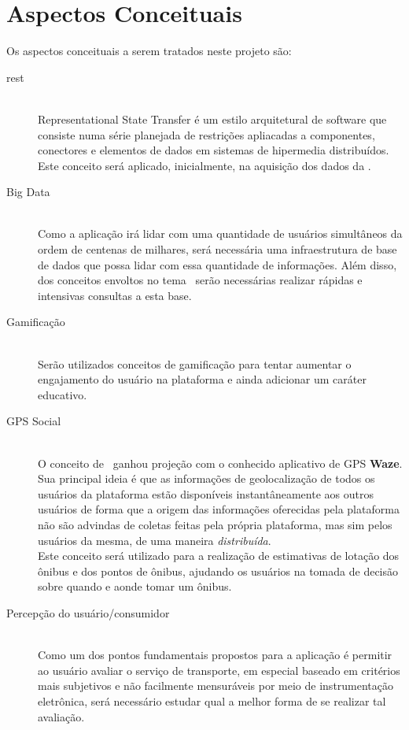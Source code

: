 \chapter{Aspectos Conceituais}\label{chp:aspectosConceituais}

Os aspectos conceituais a serem tratados neste projeto são:
\begin{description}
	\item[\gls{rest}] \cite{Fielding2000} \hfill \\
	    Representational State Transfer é um estilo arquitetural de software que consiste numa série planejada de restrições apliacadas a componentes, conectores e elementos de dados em sistemas de hipermedia distribuídos. \\
	    Este conceito será aplicado, inicialmente, na aquisição dos dados da \sptrans.
	\item[Big Data] \hfill \\
	    Como a aplicação irá lidar com uma quantidade de usuários simultâneos da ordem de centenas de milhares, será necessária uma infraestrutura de base de dados que possa lidar com essa quantidade de informações. Além disso, dos conceitos envoltos no tema \bigdata~serão necessárias realizar rápidas e intensivas consultas a esta base.
	\item[Gamificação] \cite{vieira2012exploratory,Mastrocola2012} \hfill \\
	    Serão utilizados conceitos de gamificação para tentar aumentar o engajamento do usuário na plataforma e ainda adicionar um caráter educativo.
	\item[GPS Social]\cite{Miller2013,Gal-Tzur2014a,Filippi2013,Gal-Tzur2014,Nunes2014} \hfill \\
	    O conceito de \gpssocial~ganhou projeção com o conhecido aplicativo de GPS \textbf{Waze}. Sua principal ideia é que as informações de geolocalização de todos os usuários da plataforma estão disponíveis instantâneamente aos outros usuários de forma que a origem das informações oferecidas pela plataforma não são advindas de coletas feitas pela própria plataforma, mas sim pelos usuários da mesma, de uma maneira \textit{distribuída}. \\
	    Este conceito será utilizado para a realização de estimativas de lotação dos ônibus e dos pontos de ônibus, ajudando os usuários na tomada de decisão sobre quando e aonde tomar um ônibus.
	\item[Percepção do usuário/consumidor]\cite{Lai1995,Almeida2011,Almeida2007,andrade2008constructos} \hfill \\
	    Como um dos pontos fundamentais propostos para a aplicação é permitir ao usuário avaliar o serviço de transporte, em especial baseado em critérios mais subjetivos e não facilmente mensuráveis por meio de instrumentação eletrônica, será necessário estudar qual a melhor forma de se realizar tal avaliação.
\end{description}


